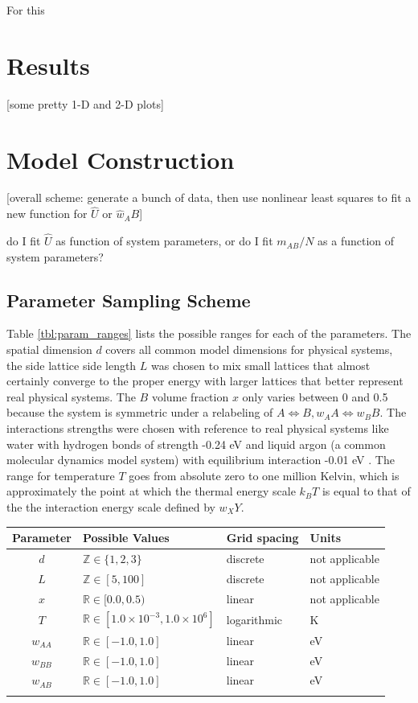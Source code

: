 \documentclass[10pt]{article}
\begin{document}
For this 

\section{Results}
[some pretty 1-D and 2-D plots]

\section{Model Construction}
[overall scheme: generate a bunch of data, then use nonlinear least squares to fit a new function for $\hat{U}$ or $\hat{w}_AB$]

do I fit $\hat{U}$ as function of system parameters, or do I fit $m_{AB}/N$ as a function of system parameters?

\subsection{Parameter Sampling Scheme}
Table \ref{tbl:param_ranges} lists the possible ranges for each of the parameters.
The spatial dimension $d$ covers all common model dimensions for physical systems, the side lattice side length $L$ was chosen to mix small lattices that almost certainly converge to the proper energy with larger lattices that better represent real physical systems.
The $B$ volume fraction $x$ only varies between 0 and 0.5 because the system is symmetric under a relabeling of $A \iff B, w_AA \iff w_BB$.
The interactions strengths were chosen with reference to real physical systems like water with hydrogen bonds of strength -0.24 eV and liquid argon (a common molecular dynamics model system) with equilibrium interaction -0.01 eV \cite{water} \cite{argon}.
The range for temperature $T$ goes from absolute zero to one million Kelvin, which is approximately the point at which the thermal energy scale $k_B T$ is equal to that of the the interaction energy scale defined by $w_XY$.

\begin{center}
\begin{tabular}{c | l | l | l} 
    \hline
    Parameter & Possible Values & Grid spacing & Units \\  \hline
    $d$ & $\mathbb{Z} \in \{1,2,3\}$ & discrete & not applicable \\ \hline
    $L$ & $\mathbb{Z} \in [5,100]$ & discrete & not applicable \\ \hline
    $x$ & $\mathbb{R} \in [0.0,0.5)$ & linear & not applicable \\ \hline
    $T$ & $\mathbb{R} \in [1.0 \times 10^{-3},1.0 \times 10^6]$ & logarithmic & K \\ \hline
    $w_{AA}$ & $\mathbb{R} \in [-1.0, 1.0]$ & linear & eV \\ \hline
    $w_{BB}$ & $\mathbb{R} \in [-1.0, 1.0]$ & linear & eV \\ \hline
    $w_{AB}$ & $\mathbb{R} \in [-1.0, 1.0]$ & linear & eV \\
    \label{tbl:param_ranges}
\end{tabular}
\end{center}
\end{document}
